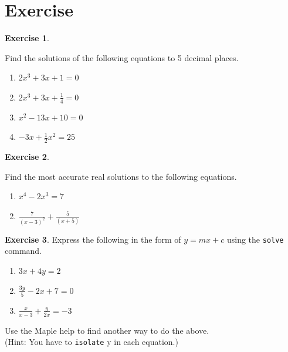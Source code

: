 \documentclass[
]{book}
\providecommand{\tightlist}{%
  \setlength{\itemsep}{0pt}\setlength{\parskip}{0pt}}
\theoremstyle{definition}
\theoremstyle{definition}
\theoremstyle{definition}
\newtheorem{exercise}{Exercise}[chapter]
\theoremstyle{definition}
\theoremstyle{remark}
\begin{document}
\section{Exercise}\label{exercise-10}

\begin{exercise}
\protect\hypertarget{exr:unnamed-chunk-55}{}\label{exr:unnamed-chunk-55}

Find the solutions of the following equations to 5 decimal places.

\begin{enumerate}
\def\labelenumi{\roman{enumi}.}
\tightlist
\item
  \(2x^3 + 3x + 1 = 0\)
\item
  \(2x^3 + 3x + \frac{1}{4} = 0\)
\item
  \(x^2 - 13x + 10 = 0\)
\item
  \(-3x + \frac{1}{2}x^2 = 25\)
\end{enumerate}

\end{exercise}

\begin{exercise}
\protect\hypertarget{exr:unnamed-chunk-56}{}\label{exr:unnamed-chunk-56}

Find the most accurate real solutions to the following equations.

\begin{enumerate}
\def\labelenumi{\roman{enumi}.}
\tightlist
\item
  \(x^4 - 2x^3 = 7\)
\item
  \(\frac{7}{(x-3)^2} + \frac{5}{(x+5)}\)
\end{enumerate}

\end{exercise}

\begin{exercise}
\protect\hypertarget{exr:unnamed-chunk-57}{}\label{exr:unnamed-chunk-57}Express the following in the form of \(y =mx +c\) using the \texttt{solve} command.

\begin{enumerate}
\def\labelenumi{\roman{enumi}.}
\tightlist
\item
  \(3x + 4y = 2\)
\item
  \(\frac{3y}{5} - 2x + 7 = 0\)
\item
  \(\frac{x}{x-3} + \frac{y}{2x} = -3\)
\end{enumerate}

Use the Maple help to find another way to do the above.\\
(Hint: You have to \texttt{isolate} y in each equation.)
\end{exercise}
\end{document}
